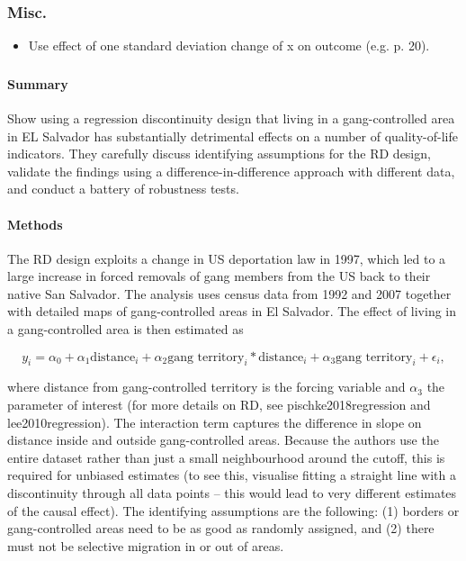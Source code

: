 \documentclass[a4paper, 11pt]{report}
\begin{document}
\subsubsection{Misc.}
\begin{itemize}
	\item Use effect of one standard deviation change of x on outcome (e.g. \citet{ameriks2003wealth} p. 20).

\end{itemize}

\subsubsection*{\citet{melnikov2019gangs}}

\paragraph{Summary}
Show using a regression discontinuity design that living in a gang-controlled area in EL Salvador has substantially detrimental effects on a number of quality-of-life indicators. They carefully discuss identifying assumptions for the RD design, validate the findings using a difference-in-difference approach with different data, and conduct a battery of robustness tests.

\paragraph{Methods}
The RD design exploits a change in US deportation law in 1997, which led to a large increase in forced removals of gang members from the US back to their native San Salvador. The analysis uses census data from 1992 and 2007 together with detailed maps of gang-controlled areas in El Salvador. The effect of living in a gang-controlled area is then estimated as

\begin{equation*}
	y_i = \alpha_0 + \alpha_1 \text{distance}_i + \alpha_2 \text{gang territory}_i * \text{distance}_i + \alpha_3 \text{gang territory}_i + \epsilon_i,
\end{equation*}

where distance from gang-controlled territory is the forcing variable and $\alpha_3$ the parameter of interest (for more details on RD, see pischke2018regression and lee2010regression). The interaction term captures the difference in slope on distance inside and outside gang-controlled areas. Because the authors use the entire dataset rather than just a small neighbourhood around the cutoff, this is required for unbiased estimates (to see this, visualise fitting a straight line with a discontinuity through all data points -- this would lead to very different estimates of the causal effect). The identifying assumptions are the following: (1) borders or gang-controlled areas need to be as good as randomly assigned, and (2) there must not be selective migration in or out of areas.
\end{document}

